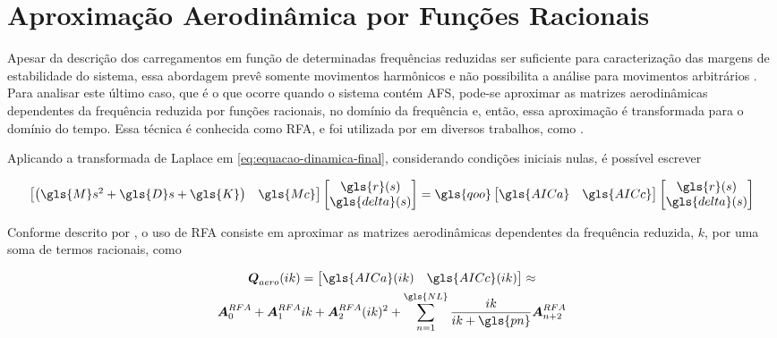



\section{Aproximação Aerodinâmica por Funções Racionais}\label{sec:rfa-solucao}

Apesar da descrição dos carregamentos em função de determinadas frequências reduzidas ser suficiente para caracterização das margens de estabilidade do sistema, essa abordagem prevê somente movimentos harmônicos e não possibilita a análise para movimentos arbitrários \cite{art:NASA1367}. Para analisar este último caso, que é o que ocorre quando o sistema contém \gls{AFS}, pode-se aproximar as matrizes aerodinâmicas dependentes da frequência reduzida por funções racionais, no domínio da frequência e, então, essa aproximação é transformada para o domínio do tempo. Essa técnica é conhecida como \gls{RFA}, e foi utilizada por em diversos trabalhos, como \textcite{book:Wright-Cooper, art:NASA1367, art:NASA2776, art:RogerRFA1977}.

Aplicando a transformada de Laplace em \eqref{eq:equacao-dinamica-final}, considerando condições iniciais nulas, é possível escrever

\begin{equation} \label{eq:equacao-dinamica-laplace}
    \begin{bmatrix}
         \left(\gls{M}s^2+\gls{D}s+\gls{K} \right) & \gls{Mc}
    \end{bmatrix}
    \begin{bmatrix}
        \gls{r}(s) \\ \gls{delta}(s)
    \end{bmatrix}
    =
    \gls{qoo}\begin{bmatrix}
        \gls{AICa} & \gls{AICc}
    \end{bmatrix}
    \begin{bmatrix}
        \gls{r}(s) \\ \gls{delta}(s)
    \end{bmatrix}
\end{equation}

Conforme descrito por \textcite{art:NASA1367}, o uso de \gls{RFA} consiste em aproximar as matrizes aerodinâmicas dependentes da frequência reduzida, $k$, por uma soma de termos racionais, como

\begin{multline}\label{eq:definicao-RFA}
    \boldsymbol{Q}_{aero}(ik) = 
    \begin{bmatrix}
        \gls{AICa}(ik) & \gls{AICc}(ik)
    \end{bmatrix}
    \approx \\
    \boldsymbol{A}_{0}^{RFA} + \boldsymbol{A}_{1}^{RFA}ik + \boldsymbol{A}_{2}^{RFA}(ik)^2 + \sum_{n=1}^{\gls{NL}} \frac{ik}{ik+\gls{pn}}\boldsymbol{A}_{n+2}^{RFA}
\end{multline}


